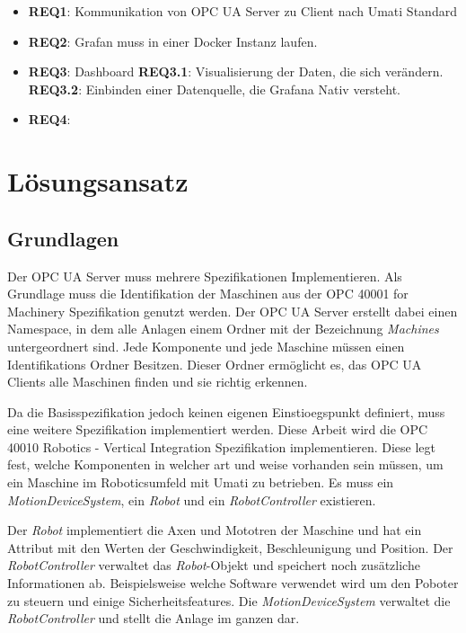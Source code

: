 \documentclass[a4paper, 12pt, oneside, toc=listofnumbered, bibliography=totoc]{scrbook}
\begin{document}
		
		\begin{itemize}
			\item \textbf{REQ1}: Kommunikation von OPC UA Server zu Client nach Umati Standard
			\item \textbf{REQ2}: Grafan muss in einer Docker Instanz laufen.
			\item \textbf{REQ3}: Dashboard
			\subitem \textbf{REQ3.1}: Visualisierung der Daten, die sich verändern.
			\subitem \textbf{REQ3.2}: Einbinden einer Datenquelle, die Grafana Nativ versteht.
			\item \textbf{REQ4}: 
		\end{itemize}
		
			
		
	\section{Lösungsansatz}
	
		\subsection{Grundlagen}
		Der OPC UA Server muss mehrere Spezifikationen Implementieren. Als Grundlage muss die Identifikation der Maschinen aus der OPC 40001 for Machinery Spezifikation genutzt werden. Der OPC UA Server erstellt dabei einen Namespace, in dem alle Anlagen einem Ordner mit der Bezeichnung \textit{Machines} untergeordnert sind. Jede Komponente und jede Maschine müssen einen Identifikations Ordner Besitzen. Dieser Ordner ermöglicht es, das OPC UA Clients alle Maschinen finden und sie richtig erkennen. 
		
		Da die Basisspezifikation jedoch keinen eigenen Einstioegspunkt definiert, muss eine weitere Spezifikation implementiert werden. Diese Arbeit wird die OPC 40010 Robotics - Vertical Integration Spezifikation implementieren. Diese legt fest, welche Komponenten in welcher art und weise vorhanden sein müssen, um ein Maschine im Roboticsumfeld mit Umati zu betrieben. Es muss ein \textit{MotionDeviceSystem}, ein \textit{Robot} und ein \textit{RobotController} existieren. 
		
		Der \textit{Robot} implementiert die Axen und Mototren der Maschine und hat ein Attribut mit den Werten der Geschwindigkeit, Beschleunigung und Position. Der \textit{RobotController} verwaltet das \textit{Robot}-Objekt und speichert noch zusätzliche Informationen ab. Beispielsweise welche Software verwendet wird um den Poboter zu steuern und einige Sicherheitsfeatures. Die \textit{MotionDeviceSystem} verwaltet die \textit{RobotController} und stellt die Anlage im ganzen dar.
		
\end{document}

